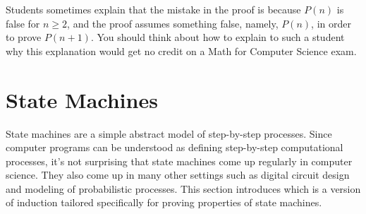 
\iffalse %

The mistake in this argument is in the sentence that begins ``So $h_1$
is the same color as the remaining horses besides $h_{n+1}$ ---that is
$h_2, \dots, h_n, \dots$.''  The ``$\dots$'' notation in the
expression ``$h_1, h_2, \dots, h_n, h_{n+1}$'' creates the impression
that there are some remaining horses ---namely $h_2, \dots, h_n$
---besides $h_1$ and $h_{n+1}$.  However, this is not true when $n =
1$.  In that case, $h_1, h_2, \dots, h_n, h_{n+1}$ is just $h_1, h_2$
and \emph{there are no ``remaining'' horses} for $h_1$ to share a
color with.  And of course in this case $h_1$ and $h_2$ really don't
need to be the same color.

This mistake knocks a critical link out of our induction argument.  We
proved $P(1)$ and we \emph{correctly} proved $P(2) \implies P(3)$, $P(3)
\implies P(4)$, etc.  But we failed to prove $P(1) \implies P(2)$, and so
everything falls apart: we can not conclude that $P(2)$, $P(3)$, etc., are
true.  And, of course, these propositions are all false; there are
sets of $n$ horses of different colors for all $n \ge 2$.

\fi


Students sometimes explain that the mistake in the proof is because
$P(n)$ is false for $n \geq 2$, and the proof assumes something false,
namely, $P(n)$, in order to prove $P(n+1)$.  You should think about
how to explain to such a student why this explanation would get no
credit on a Math for Computer Science exam.

\begin{problems}
\classproblems
{}
\homeworkproblems
{}
\end{problems}

\section{State Machines}
State machines are a simple abstract model of step-by-step processes.
Since computer programs can be understood as defining step-by-step
computational processes, it's not surprising that state machines come
up regularly in computer science.  They also come up in many other
settings such as digital circuit design and modeling of probabilistic
processes.  This section introduces  which is a version of induction tailored specifically for
proving properties of state machines.

